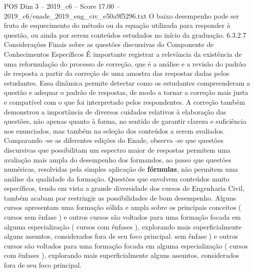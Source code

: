 \begin{textsample}{POS Dim 3 – 2019\_c6 – Score 17.00 – 2019\_c6/enade\_2019\_eng\_civ\_e50a9f5296.txt}
O baixo desempenho pode ser fruto de esquecimento do método ou da equação utilizada para responder à questão, ou ainda por serem conteúdos estudados no início da graduação. 6.3.2.7 Considerações Finais sobre as questões discursivas do Componente de Conhecimentos Específicos É importante registrar a relevância da existência de uma reformulação do processo de correção, que é a análise e a revisão do padrão de resposta a partir da correção de uma amostra das respostas dadas pelos estudantes.
Essa dinâmica permite detectar como os estudantes compreenderam a questão e adequar o padrão de respostas, de modo a tornar a correção mais justa e compatível com o que foi interpretado pelos respondentes.
A correção também demonstrou a importância de diversos cuidados relativos à elaboração das questões, não apenas quanto à forma, no sentido de garantir clareza e suficiência nos enunciados, mas também na seleção dos conteúdos a serem avaliados.
Comparando -se as diferentes edições do Enade, observa -se que questões discursivas que possibilitam um espectro maior de respostas permitem uma avaliação mais ampla do desempenho dos formandos, ao passo que questões numéricas, resolvidas pela simples aplicação de \textbf{fórmulas}, não permitem uma análise da qualidade da formação.
Questões que envolvem conteúdos muito específicos, tendo em vista a grande diversidade dos cursos de Engenharia Civil, também acabam por restringir as possibilidades de bom desempenho.
Alguns cursos apresentam uma formação sólida e ampla sobre os principais conceitos ( cursos sem ênfase ) e outros cursos são voltados para uma formação focada em alguma especialização ( cursos com ênfases ), explorando mais superficialmente alguns assuntos, considerados fora de seu foco principal. sem ênfase ) e outros cursos são voltados para uma formação focada em alguma especialização ( cursos com ênfases ), explorando mais superficialmente alguns assuntos, considerados fora de seu foco principal.

\end{textsample}
